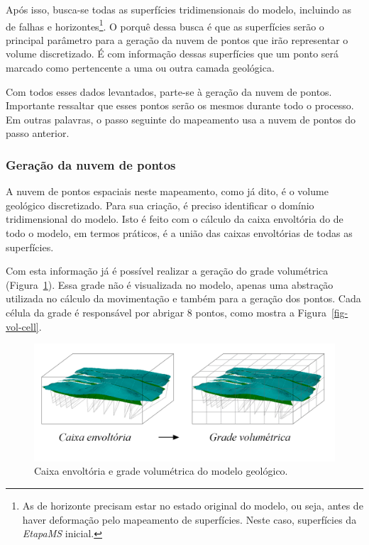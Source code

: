 Após isso, busca-se todas as superfícies tridimensionais do modelo, incluindo as de falhas e horizontes\footnote{As de horizonte precisam estar no estado original do modelo, ou seja, antes de haver deformação pelo mapeamento de superfícies. Neste caso, superfícies da \emph{EtapaMS} inicial.}. O porquê dessa busca é que as superfícies serão o principal parâmetro para a geração da nuvem de pontos que irão representar o volume discretizado. É com informação dessas superfícies que um ponto será marcado como pertencente a uma ou outra camada geológica.

Com todos esses dados levantados, parte-se à geração da nuvem de pontos. Importante ressaltar que esses pontos serão os mesmos durante todo o processo. Em outras palavras, o passo seguinte do mapeamento usa a nuvem de pontos do passo anterior.

\subsubsection{Geração da nuvem de pontos} 

A nuvem de pontos espaciais neste mapeamento, como já dito, é o volume geológico discretizado. Para sua criação, é preciso identificar o domínio tridimensional do modelo. Isto é feito com o cálculo da caixa envoltória do de todo o modelo, em termos práticos, é a união das caixas envoltórias de todas as superfícies.

Com esta informação já é possível realizar a geração do grade volumétrica (Figura~\ref{fig-vol-grid}). Essa grade não é visualizada no modelo, apenas uma abstração utilizada no cálculo da movimentação e também para a geração dos pontos. Cada célula da grade é responsável por abrigar 8 pontos, como mostra a Figura~\ref{fig-vol-cell}.

\begin{figure} [H]
  \begin{center}
    \includegraphics[width=\textwidth]{images/fig-vol-grid}
    \caption{Caixa envoltória e grade volumétrica do modelo geológico.}\label{fig-vol-grid}
  \end{center}
\end{figure}

